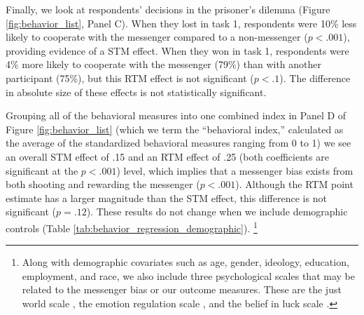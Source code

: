 Finally, we look at respondents' decisions in the prisoner's dilemma
(Figure \ref{fig:behavior_list}, Panel C). When they lost in task 1, respondents were
10\% less likely to cooperate with the messenger compared to a
non-messenger ($p < .001$), providing evidence of a STM
effect. When they won in task 1, respondents were 4\% more likely to
cooperate with the messenger (79\%) than with another participant
(75\%), but this RTM effect is not significant ($p < .1$).
The difference in absolute size of these effects is not statistically
significant.

Grouping all of the behavioral measures into one combined index in
Panel D of Figure \ref{fig:behavior_list} (which we term the ``behavioral index,''
calculated as the average of the standardized behavioral measures
ranging from 0 to 1) we see an overall
STM effect of .15 and an RTM effect of .25 (both coefficients are
significant at the $p < .001$) level, which implies that
a messenger bias exists from both shooting and rewarding the messenger
($p < .001$). Although the RTM point estimate has a larger
magnitude than the STM effect, this difference is not significant ($p
= .12$). These results do not change when we include
demographic controls (Table \ref{tab:behavior_regression_demographic}).
\footnote{Along with demographic covariates such as age, gender, ideology,
education, employment, and race, we also include three psychological scales that may be
related to the messenger bias or our outcome measures. These are the just world
scale \citep{lipkus1991construction}, the emotion regulation scale \citep{buss1992aggression}, and the
belief in luck scale \citep{darke1997belief}.}


